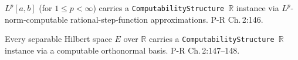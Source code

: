 \begin{theorem}
  \label{thm:l4_lp_instance}
  \notready
  $L^p[a,b]$ (for $1 \le p < \infty$) carries a \texttt{ComputabilityStructure}~$\mathbb{R}$ instance via $L^p$-norm-computable rational-step-function approximations. P-R Ch.\,2:146.
\end{theorem}

\begin{theorem}
  \label{thm:l4_hilbert_instance}
  \notready
  Every separable Hilbert space $E$ over $\mathbb{R}$ carries a \texttt{ComputabilityStructure}~$\mathbb{R}$ instance via a computable orthonormal basis. P-R Ch.\,2:147--148.
\end{theorem}
